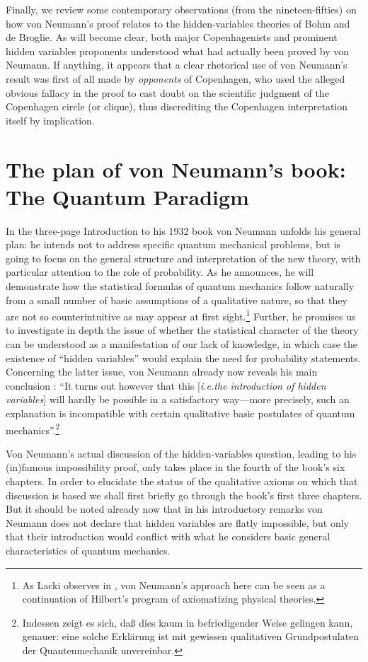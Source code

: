 \documentclass[12pt]{article}
\begin{document}
Finally, we review some contemporary observations (from the nineteen-fifties) on how von Neumann's proof relates to the hidden-variables theories of Bohm and de Broglie. As will become clear, both major Copenhagenists and prominent hidden variables proponents understood what had actually been proved by von Neumann. If anything, it appears that a clear rhetorical use of von Neumann's result was first of all made by \emph{opponents} of Copenhagen, who used the alleged obvious fallacy in the proof to cast doubt on the scientific judgment of the Copenhagen circle (or clique), thus discrediting the Copenhagen interpretation itself by implication.

\section{The plan of von Neumann's book: The Quantum Paradigm}\label{book}

In the three-page Introduction to his 1932 book von Neumann unfolds his general plan: he intends not to address specific quantum mechanical problems, but is going to focus on the general structure and interpretation of the new theory, with particular attention to the role of probability. As he announces, he will demonstrate how the statistical formulas of quantum mechanics follow naturally from a small number of basic assumptions of a qualitative nature, so that they are not so counterintuitive as may appear at first sight.\footnote{As Lacki observes in \cite{lacki}, von Neumann's approach here can be seen as a continuation of Hilbert's program of axiomatizing physical theories.}  Further, he promises us to investigate in depth the issue of whether the statistical character of the theory can be understood as a manifestation of our lack of knowledge, in which case the existence of ``hidden variables'' would explain the need for probability statements. Concerning the latter issue, von Neumann already now reveals his main conclusion \cite[pp.\@ 2--3]{VN1}: ``It turns out however that this [\emph{i.e.\@ the introduction of hidden variables}] will hardly be possible in a satisfactory way---more precisely, such an explanation is incompatible with certain qualitative basic postulates of quantum mechanics''.\footnote{Indessen zeigt es sich, da{\ss} dies kaum in befriedigender Weise gelingen kann, genauer: eine solche Erkl\"{a}rung ist mit gewissen qualitativen Grundpostulaten der Quantenmechanik unvereinbar.}

Von Neumann's actual discussion of the hidden-variables question, leading to his (in)famous impossibility proof, only takes place in the fourth of the book's six chapters. In order to elucidate the status of the qualitative axioms on which that discussion is based we shall first briefly go through the book's first three chapters. But it should be noted already now that in his introductory remarks von Neumann does not declare that hidden variables are flatly impossible, but only that their introduction would conflict with what he considers basic general characteristics of quantum mechanics.
\end{document}
